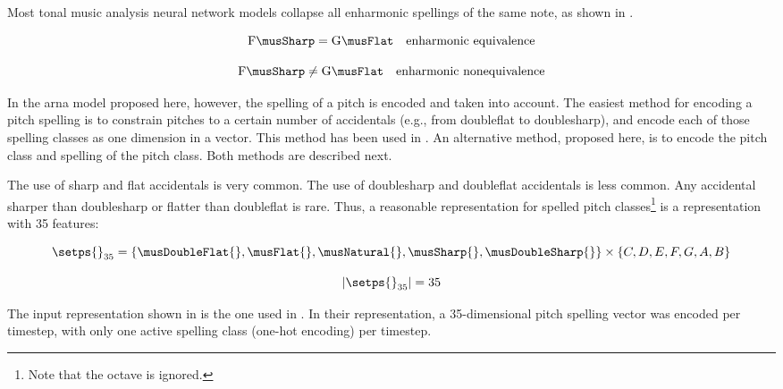 
Most tonal music analysis neural network models collapse all
enharmonic spellings of the same note, as shown in
.

\begin{equation}
    \label{eq:enharmonic_equivalence}
    \text{F}\musSharp = \text{G}\musFlat \quad \text{enharmonic equivalence}
\end{equation}

\begin{equation}
    \label{eq:enharmonic_nonequivalence}
    \text{F}\musSharp \neq \text{G}\musFlat \quad \text{enharmonic nonequivalence}
\end{equation}

In the \gls{arna} model proposed here, however, the spelling
of a pitch is encoded and taken into account. The easiest
method for encoding a pitch spelling is to constrain pitches
to a certain number of accidentals (e.g., from
\gls{doubleflat} to \gls{doublesharp}), and encode each of
those spelling classes as one dimension in a vector. This
method has been used in \textcite{micchi2020not,
micchi2021deep}. An alternative method, proposed here, is to
encode the pitch class and spelling of the pitch class. Both
methods are described next.


The use of \gls{sharp} and \gls{flat} accidentals is very
common. The use of \gls{doublesharp} and \gls{doubleflat}
accidentals is less common. Any accidental sharper than
\gls{doublesharp} or flatter than \gls{doubleflat} is rare.
Thus, a reasonable representation for spelled pitch
classes\footnote{Note that the octave is ignored.} is a
representation with 35 features:

\begin{equation}
    \label{eq:pitch_spelling_35}
    \setps{}_{35} = \{\musDoubleFlat{}, \musFlat{}, 
    \musNatural{}, \musSharp{}, \musDoubleSharp{} \}
    \times 
    \{C, D, E, F, G, A, B \}
\end{equation}

\begin{equation}
    \label{eq:pitch_spelling_35_magnitude}
    | \setps{}_{35} | = 35
\end{equation}

The input representation shown in 
is the one used in \textcite{micchi2020not, micchi2021deep}.
In their representation, a 35-dimensional pitch spelling
vector was encoded per timestep, with only one active
spelling class (one-hot encoding) per timestep.

